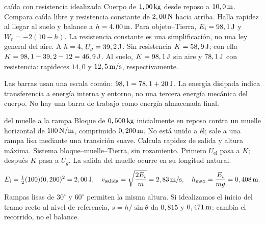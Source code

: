 \documentclass[11pt,a4paper]{article}
\begin{document}
\begin{examplebox}{ca\'ida con resistencia idealizada}
 Cuerpo de $1,00\,\mathrm{kg}$ desde reposo a $10,0\,\mathrm{m}$.
Compara ca\'ida libre y resistencia constante de $2,00\,\mathrm{N}$ hacia arriba.
Halla rapidez al llegar al suelo y balance a $h=4,00\,\mathrm{m}$.
\solutionblock
{} Para objeto--Tierra, $E_i=98,1\,\mathrm{J}$ y
$W_r=-2(10-h)$. La resistencia constante es una simplificaci\'on,
no una ley general del aire.
 A $h=4$, $U_g=39,2\,\mathrm{J}$.
Sin resistencia $K=58,9\,\mathrm{J}$; con ella $K=98,1-39,2-12=46,9\,\mathrm{J}$.
Al suelo, $K=98,1\,\mathrm{J}$ sin aire y $78,1\,\mathrm{J}$ con resistencia:
rapideces $14,0$ y $12,5\,\mathrm{m/s}$, respectivamente.
\begin{center}
\end{center}
 Las barras usan una escala com\'un:
$98,1=78,1+20\,\mathrm{J}$. La energ\'ia disipada indica transferencia a energ\'ia interna
y entorno, no una tercera energ\'ia mec\'anica del cuerpo.
No hay una barra de trabajo como energ\'ia almacenada final.
\end{examplebox}

\begin{examplebox}{del muelle a la rampa}
 Bloque de $0,500\,\mathrm{kg}$ inicialmente en reposo contra un muelle
horizontal de $100\,\mathrm{N/m}$, comprimido $0,200\,\mathrm{m}$.
No est\'a unido a \'el; sale a una rampa lisa mediante una transici\'on suave.
Calcula rapidez de salida y altura m\'axima.
\solutionblock
{} Sistema bloque--muelle--Tierra, sin rozamiento.
Primero $U_{\mathrm{el}}$ pasa a $K$; despu\'es $K$ pasa a $U_g$.
La salida del muelle ocurre en su longitud natural.
\[
E_i=\tfrac12(100)(0,200)^2=2,00\,\mathrm{J},\quad
v_{\mathrm{salida}}=\sqrt{\frac{2E_i}{m}}=2,83\,\mathrm{m/s},\quad
h_{\max}=\frac{E_i}{mg}=0,408\,\mathrm{m}.
\]
 Rampas lisas de $30^\circ$ y $60^\circ$ permiten la misma
altura. Si idealizamos el inicio del tramo recto al nivel de referencia,
$s=h/\sin\theta$ da $0,815$ y $0,471\,\mathrm{m}$: cambia el recorrido, no el balance.
\end{examplebox}
\end{document}
